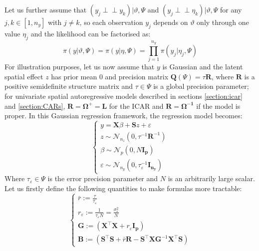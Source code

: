 \documentclass[openany, 11pt, oneside]{book}
\begin{document}
Let us further assume that $(y_j\perp\!\!\!\perp y_k )\vert\vartheta, \Psi$ and $(y_j\perp\!\!\!\perp \eta_k )\vert\vartheta, \Psi$ for any $j,k \in [1, n_y]$ with $j \neq k$, so each observation $y_j$ depends on $\vartheta$ only through one value $\eta_j$ and the likelihood can be factorised as:
$$
\pi(y\vert\vartheta, \Psi) = \pi(y\vert \eta, \Psi) = \prod_{j = 1}^{n_y} \pi(y_j \vert \eta_j, \Psi)
$$
For illustration purposes, let us now assume that $y$ is Gaussian and the latent spatial effect $z$ has prior mean $0$ and precision matrix $\boldsymbol{Q}(\Psi) = \tau \boldsymbol{R}$, where $\boldsymbol{R}$ is a positive semidefinite structure matrix and $\tau \in \Psi$ is a global precision parameter; for univariate spatial autoregressive models described in sections \ref{section:icar} and \ref{section:CARs}, $\boldsymbol{R}=\boldsymbol{\Omega^+}=\boldsymbol{L}$ for the ICAR and $\boldsymbol{R}=\boldsymbol{\Omega^{-1}}$ if the model is proper. In this Gaussian regression framework, the regression model becomes:
%
\begin{equation}
\left\{ \begin{array}{ll} 
    y = \boldsymbol{X} \beta + \boldsymbol{S} z + \varepsilon \\
    z \sim \mathcal{N}_{n_z} (0, \tau^{-1} \boldsymbol{R}^{-1}) \\
    \beta \sim \mathcal{N}_p(0, N\boldsymbol{I_p})\\
    \varepsilon \sim \mathcal{N}_{n_y}(0, \tau_{\varepsilon}^{-1}\boldsymbol{I_{n_y}})
    \end{array} \right.
    \label{eq:LGM_eps}
\end{equation}
%
Where $\tau_\varepsilon \in \Psi$ is the error precision parameter and $N$ is an arbitrarily large scalar. Let us firstly define the following quantities to make formulas more tractable:
%
\begin{equation}
\left\{ \begin{array}{ll}
\bar{r} := \frac{\tau}{\tau_\varepsilon} \\
r_\varepsilon := \frac{1}{\tau_\varepsilon N} = \frac{\sigma_\varepsilon^2}{N} \\
\boldsymbol{G} := (\boldsymbol{X}^{\top}\boldsymbol{X} + r_{\varepsilon}\boldsymbol{I_p})\\
\boldsymbol{B} := (\boldsymbol{S} ^{\top} \boldsymbol{S} + \bar{r} \boldsymbol{R} - \boldsymbol{S} ^{\top} \boldsymbol{X G}^{-1} \boldsymbol{X}^{\top}\boldsymbol{S})
\end{array} \right.
\label{eq:auxiliary}
\end{equation}
\end{document}
